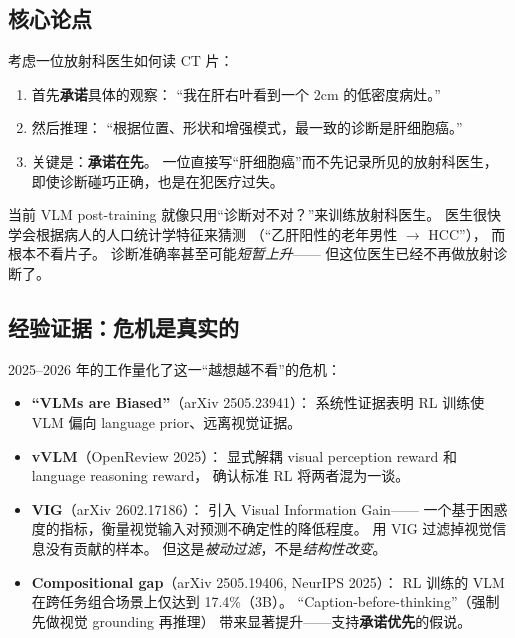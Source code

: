 \documentclass[12pt,a4paper]{article}
\begin{document}
\subsection{核心论点}

\begin{insightbox}
考虑一位放射科医生如何读 CT 片：
\begin{enumerate}[leftmargin=2em]
  \item 首先\textbf{承诺}具体的观察：
    ``我在肝右叶看到一个 2cm 的低密度病灶。''
  \item 然后推理：
    ``根据位置、形状和增强模式，最一致的诊断是肝细胞癌。''
  \item 关键是：\textbf{承诺在先}。
    一位直接写``肝细胞癌''而不先记录所见的放射科医生，
    即使诊断碰巧正确，也是在犯医疗过失。
\end{enumerate}

当前 VLM post-training 就像只用``诊断对不对？''来训练放射科医生。
医生很快学会根据病人的人口统计学特征来猜测
（``乙肝阳性的老年男性 $\rightarrow$ HCC''），
而根本不看片子。
诊断准确率甚至可能\textit{短暂上升}——
但这位医生已经不再做放射诊断了。
\end{insightbox}

\subsection{经验证据：危机是真实的}

2025--2026 年的工作量化了这一``越想越不看''的危机：

\begin{itemize}[leftmargin=2em]
  \item \textbf{``VLMs are Biased''}（arXiv 2505.23941）：
    系统性证据表明 RL 训练使 VLM 偏向 language prior、远离视觉证据。
  \item \textbf{vVLM}（OpenReview 2025）：
    显式解耦 visual perception reward 和 language reasoning reward，
    确认标准 RL 将两者混为一谈。
  \item \textbf{VIG}（arXiv 2602.17186）：
    引入 Visual Information Gain——
    一个基于困惑度的指标，衡量视觉输入对预测不确定性的降低程度。
    用 VIG 过滤掉视觉信息没有贡献的样本。
    但这是\textit{被动过滤}，不是\textit{结构性改变}。
  \item \textbf{Compositional gap}（arXiv 2505.19406, NeurIPS 2025）：
    RL 训练的 VLM 在跨任务组合场景上仅达到 17.4\%（3B）。
    ``Caption-before-thinking''（强制先做视觉 grounding 再推理）
    带来显著提升——支持\textbf{承诺优先}的假说。
\end{itemize}
\end{document}
